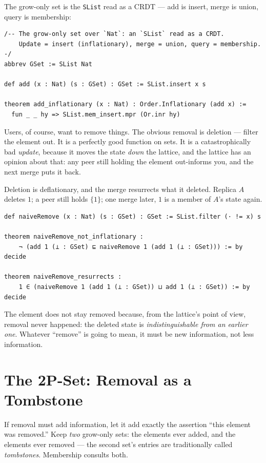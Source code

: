 \documentclass[12pt, a4paper, openright]{book}
\theoremstyle{thmstyle}
\theoremstyle{defstyle}
\newcommand{\lc}[1]{\texttt{#1}}
\newcounter{refutation}[chapter]
\renewcommand{\therefutation}{\thechapter.\arabic{refutation}}
\newenvironment{refutedbox}[1]{%
  \refstepcounter{refutation}%
  \begin{tcolorbox}[refutedbox,
    title={Refuted \therefutation\ --- #1}]%
}{\end{tcolorbox}}
\begin{document}
The grow-only set is the \lc{SList} read as a CRDT --- add is insert,
merge is union, query is membership:

\begin{verbatim}
/-- The grow-only set over `Nat`: an `SList` read as a CRDT.
    Update = insert (inflationary), merge = union, query = membership. -/
abbrev GSet := SList Nat

def add (x : Nat) (s : GSet) : GSet := SList.insert x s

theorem add_inflationary (x : Nat) : Order.Inflationary (add x) :=
  fun _ _ hy => SList.mem_insert.mpr (Or.inr hy)
\end{verbatim}

Users, of course, want to remove things. The obvious removal is
deletion --- filter the element out. It is a perfectly good function on
sets. It is a catastrophically bad \emph{update}, because it moves the
state \emph{down} the lattice, and the lattice has an opinion about
that: any peer still holding the element out-informs you, and the next
merge puts it back.

\begin{refutedbox}{Remove-by-deletion is inflationary}
  \label{ref:naive-remove}
  Deletion is deflationary, and the merge resurrects what it deleted.
  Replica $A$ deletes $1$; a peer still holds $\{1\}$; one merge later,
  $1$ is a member of $A$'s state again.
\begin{verbatim}
def naiveRemove (x : Nat) (s : GSet) : GSet := SList.filter (· != x) s

theorem naiveRemove_not_inflationary :
    ¬ (add 1 (⊥ : GSet) ⊑ naiveRemove 1 (add 1 (⊥ : GSet))) := by decide

theorem naiveRemove_resurrects :
    1 ∈ (naiveRemove 1 (add 1 (⊥ : GSet)) ⊔ add 1 (⊥ : GSet)) := by decide
\end{verbatim}
  The element does not stay removed because, from the lattice's point of
  view, removal never happened: the deleted state is
  \emph{indistinguishable from an earlier one}. Whatever ``remove''
  is going to mean, it must be new information, not less information.
\end{refutedbox}

\section{The 2P-Set: Removal as a Tombstone}

If removal must add information, let it add exactly the assertion ``this
element was removed.'' Keep \emph{two} grow-only sets: the elements ever
added, and the elements ever removed --- the second set's entries are
traditionally called \emph{tombstones}. Membership consults both.
\end{document}

